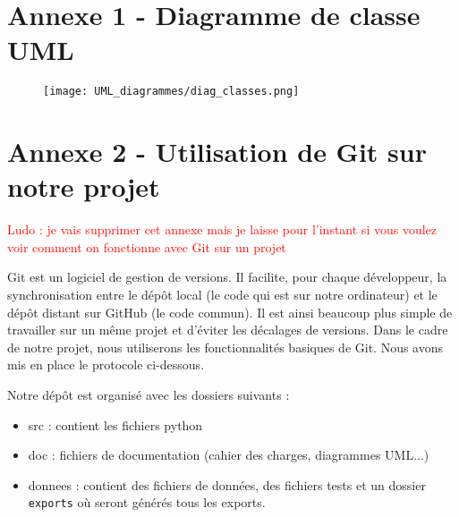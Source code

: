 \documentclass[11pt]{article}
\begin{document}




\appendix  %
\section*{Annexe 1 - Diagramme de classe UML}


\begin{figure}[H]
    \label{UML_classes}
    \centering
    \texttt{[image: UML\_diagrammes/diag\_classes.png]}
\end{figure}


\restoregeometry




\newpage

\section*{Annexe 2 - Utilisation de Git sur notre projet}

\textcolor{red}{Ludo : je vais supprimer cet annexe mais je laisse pour l'instant si vous voulez voir comment on fonctionne avec Git sur un projet}


Git est un logiciel de gestion de versions. Il facilite, pour chaque développeur, la synchronisation entre le dépôt local (le code qui est sur notre ordinateur) et le dépôt distant sur GitHub (le code commun). Il est ainsi beaucoup plus simple de travailler sur un même projet et d'éviter les décalages de versions. Dans le cadre de notre projet, nous utiliserons les fonctionnalités basiques de Git. Nous avons mis en place le protocole ci-dessous.

\bigbreak

Notre dépôt est organisé avec les dossiers suivants :
\begin{itemize}
    \item src : contient les fichiers python
    \item doc : fichiers de documentation (cahier des charges, diagrammes UML...)
    \item donnees : contient des fichiers de données, des fichiers tests et un dossier \texttt{exports} où seront générés tous les exports. 
\end{itemize}
\end{document}
